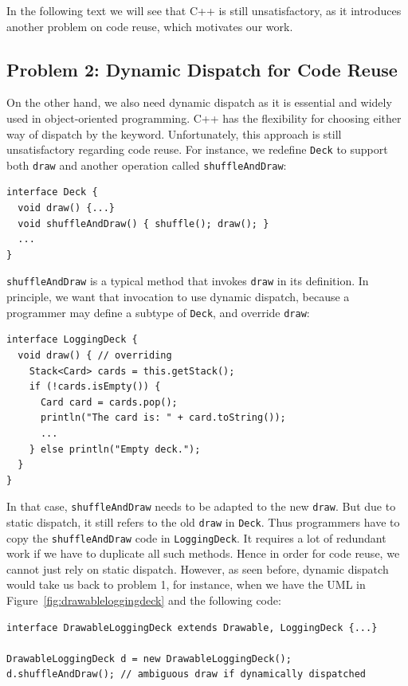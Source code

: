 In the following text we will see that C++ is still unsatisfactory, as it introduces another problem on code reuse, which motivates
our work.

\subsection{Problem 2: Dynamic Dispatch for Code Reuse}\label{subsec:problem2}

On the other hand, we also need dynamic dispatch as it is essential and widely used in object-oriented programming.
C++ has the flexibility for choosing either way of dispatch by the \kwvirtual{} keyword.
Unfortunately, this approach is still unsatisfactory regarding code reuse. For instance, 
we redefine \lstinline|Deck| to support
both \lstinline|draw| and another operation called \lstinline|shuffleAndDraw|:
\vspace{3pt}\begin{lstlisting}
interface Deck {
  void draw() {...}
  void shuffleAndDraw() { shuffle(); draw(); }
  ...
}
\end{lstlisting}\vspace{3pt}
\lstinline|shuffleAndDraw| is a typical method that invokes \lstinline|draw| in its definition. In principle, we want
that invocation to use dynamic dispatch, because a programmer may define a subtype of \lstinline|Deck|, and override \lstinline|draw|:
\vspace{3pt}\begin{lstlisting}
interface LoggingDeck {
  void draw() { // overriding
    Stack<Card> cards = this.getStack();
    if (!cards.isEmpty()) {
      Card card = cards.pop();
      println("The card is: " + card.toString());
      ...
    } else println("Empty deck.");
  }
}
\end{lstlisting}\vspace{3pt}
In that case, \lstinline|shuffleAndDraw| needs to be adapted to the new \lstinline|draw|. But due to static dispatch,
it still refers to the old \lstinline|draw| in \lstinline|Deck|. Thus programmers have to copy the \lstinline|shuffleAndDraw| code in
\lstinline|LoggingDeck|. It requires a lot of redundant work if we have to duplicate all such methods. Hence in order for code reuse,
we cannot just rely on static dispatch. However, as seen before, dynamic dispatch would take us back to problem 1, for instance, when we
have the UML in Figure~\ref{fig:drawableloggingdeck} and the following code:
\vspace{3pt}\begin{lstlisting}
interface DrawableLoggingDeck extends Drawable, LoggingDeck {...}

DrawableLoggingDeck d = new DrawableLoggingDeck();
d.shuffleAndDraw(); // ambiguous draw if dynamically dispatched
\end{lstlisting}\vspace{3pt}

